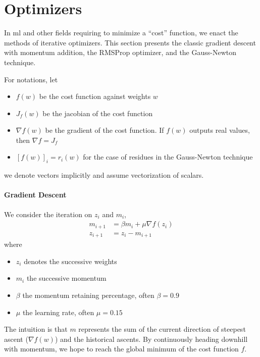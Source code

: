 \documentclass[11pt]{article}
\begin{document}
\tableofcontents
\newpage

\section{Optimizers}
In ml and other fields requiring to minimize a ``cost'' function, we enact the methods of iterative optimizers. This section presents the classic gradient descent with momentum addition, the RMSProp optimizer, and the Gauss-Newton technique.

For notations, let
\begin{itemize}
	\item $f(w)$ be the cost function against weights $w$
	\item $J_f(w)$ be the jacobian of the cost function
	\item $\nabla f(w)$ be the gradient of the cost function. If $f(w)$ outputs real values, then $\nabla f = J_f$
	\item $[f(w)]_i = r_i(w)$ for the case of residues in the Gauss-Newton technique
\end{itemize}
we denote vectors implicitly and assume vectorization of scalars.

\paragraph{Gradient Descent} We consider the iteration on $z_i$ and $m_i$,
\begin{align*}
	m_{i+1} &= \beta m_i + \mu \nabla f(z_i)\\
	z_{i+1} &= z_i - m_{i+1}
\end{align*}
where
\begin{itemize}
	\item $z_i$ denotes the successive weights
	\item $m_i$ the successive momentum
	\item $\beta$ the momentum retaining percentage, often $\beta=0.9$
	\item $\mu$ the learning rate, often $\mu=0.15$
\end{itemize}

The intuition is that $m$ represents the sum of the current direction of steepest ascent ($\nabla f(w)$) and the historical ascents. By continuously heading downhill with momentum, we hope to reach the global minimum of the cost function $f$.
\end{document}
